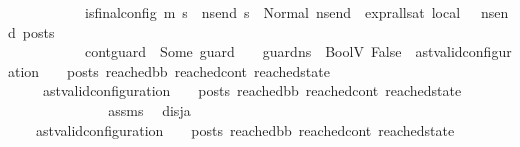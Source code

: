 \begin{isabellebody}
\ \ \ \ \ \ \ \ \ \ \ is{\isacharunderscore}{\kern0pt}final{\isacharunderscore}{\kern0pt}config\ {\isacharparenleft}{\kern0pt}m{\isacharprime}{\kern0pt}{\isacharcomma}{\kern0pt}\ s{\isacharprime}{\kern0pt}{\isacharparenright}{\kern0pt}\ {\isasymLongrightarrow}\ {\isasymforall}ns{\isacharunderscore}{\kern0pt}end{\isachardot}{\kern0pt}\ s{\isacharprime}{\kern0pt}\ {\isacharequal}{\kern0pt}\ Normal\ ns{\isacharunderscore}{\kern0pt}end\ {\isasymlongrightarrow}\ {\isacharparenleft}{\kern0pt}expr{\isacharunderscore}{\kern0pt}all{\isacharunderscore}{\kern0pt}sat\ {\isasymLambda}{}{\isacharunderscore}{\kern0pt}local\ {\isasymGamma}\ {\isasymOmega}\ ns{\isacharunderscore}{\kern0pt}end{\isacharparenright}{\kern0pt}\ posts{\isacharparenright}{\kern0pt}\ {\isasymLongrightarrow}\isanewline
\ \ \ \ \ \ \ \ \ \ \ {\isacharparenleft}{\kern0pt}{\isacharparenleft}{\kern0pt}cont{\isacharunderscore}{\kern0pt}guard\ {\isacharequal}{\kern0pt}\ Some\ guard{\isacharparenright}{\kern0pt}\ {\isasymLongrightarrow}\ {\isacharparenleft}{\kern0pt}{\isasymLambda}{\isacharcomma}{\kern0pt}{\isasymGamma}{\isacharcomma}{\kern0pt}{\isasymOmega}\ {\isasymturnstile}\ {\isasymlangle}guard{\isacharcomma}{\kern0pt}ns{}{\isacharprime}{\kern0pt}{\isacharprime}{\kern0pt}{\isasymrangle}\ {\isasymDown}\ BoolV\ False{\isacharparenright}{\kern0pt}{\isacharparenright}{\kern0pt}\ {\isasymLongrightarrow}\ {\isacharparenleft}{\kern0pt}ast{\isacharunderscore}{\kern0pt}valid{\isacharunderscore}{\kern0pt}configuration\ {\isasymLambda}\ {\isasymGamma}\ {\isasymOmega}\ posts\ reached{\isacharunderscore}{\kern0pt}bb\ reached{\isacharunderscore}{\kern0pt}cont\ reached{\isacharunderscore}{\kern0pt}state{\isacharparenright}{\kern0pt}{\isachardoublequoteclose}\isanewline
\ \ \ \ \ {\isachardoublequoteopen}ast{\isacharunderscore}{\kern0pt}valid{\isacharunderscore}{\kern0pt}configuration\ {\isasymLambda}\ {\isasymGamma}\ {\isasymOmega}\ posts\ reached{\isacharunderscore}{\kern0pt}bb\ reached{\isacharunderscore}{\kern0pt}cont\ reached{\isacharunderscore}{\kern0pt}state{\isachardoublequoteclose}\isanewline
%
\isadelimproof
%
\endisadelimproof
%
\isatagproof
{}\isamarkupfalse%
\ {\isacharminus}{\kern0pt}\ \ \ \ \ \ \ \ \ \isanewline
\ \ \isamarkupfalse%
\ assms{\isacharparenleft}{\kern0pt}{}{\isacharminus}{\kern0pt}{}{\isacharparenright}{\kern0pt}\ \isamarkupfalse%
\ disj{\isacharunderscore}{\kern0pt}a{\isacharcolon}{\kern0pt}\isanewline
\ \ \ \ {\isachardoublequoteopen}{\isacharparenleft}{\kern0pt}ast{\isacharunderscore}{\kern0pt}valid{\isacharunderscore}{\kern0pt}configuration\ {\isasymLambda}\ {\isasymGamma}\ {\isasymOmega}\ posts\ reached{\isacharunderscore}{\kern0pt}bb\ reached{\isacharunderscore}{\kern0pt}cont\ reached{\isacharunderscore}{\kern0pt}state{\isacharparenright}{\kern0pt}\ {\isasymor}\ \isanewline

\end{isabellebody}
